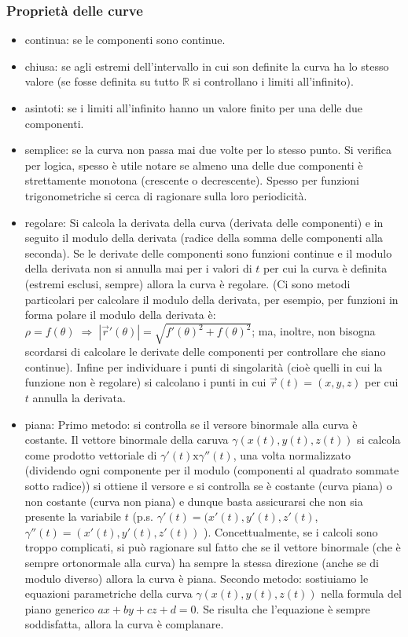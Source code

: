 \subsubsection{Proprietà delle curve}
\begin{itemize}
    \item continua: se le componenti sono continue.
    \item chiusa: se agli estremi dell'intervallo in cui son definite la curva ha lo stesso valore (se fosse definita su tutto $\mathbb{R}$ si controllano i limiti all'infinito).
    \item asintoti: se i limiti all'infinito hanno un valore finito per una delle due componenti.
    \item semplice: se la curva non passa mai due volte per lo stesso punto. Si verifica per logica, spesso è utile notare se almeno una delle due componenti è strettamente monotona (crescente o decrescente). Spesso per funzioni trigonometriche si cerca di ragionare sulla loro periodicità.
    \item regolare: Si calcola la derivata della curva (derivata delle componenti) e in seguito il modulo della derivata (radice della somma delle componenti alla seconda). Se le derivate delle componenti sono funzioni continue e il modulo della derivata non si annulla mai per i valori di $t$ per cui la curva è definita (estremi esclusi, sempre) allora la curva è regolare. (Ci sono metodi particolari per calcolare il modulo della derivata, per esempio, per funzioni in forma polare il modulo della derivata è: $\rho = f(\theta) \; \Rightarrow \; |\vec{r}'(\theta)| = \sqrt{f'(\theta)^2 + f(\theta)^2}$; ma, inoltre, non bisogna scordarsi di calcolare le derivate delle componenti per controllare che siano continue).\newline
    Infine per individuare i punti di singolarità (cioè quelli in cui la funzione non è regolare) si calcolano i punti in cui $\vec{r}(t) = (x,y,z)$ per cui $t$ annulla la derivata.
    \item piana: \newline
    Primo metodo: si controlla se il versore binormale alla curva è costante. Il vettore binormale della caruva $\gamma(x(t), y(t), z(t))$ si calcola come prodotto vettoriale di $\gamma'(t) \text{x} \gamma''(t)$, una volta normalizzato (dividendo ogni componente per il modulo (componenti al quadrato sommate sotto radice)) si ottiene il versore e si controlla se è costante (curva piana) o non costante (curva non piana) e dunque basta assicurarsi che non sia presente la variabile $t$ (p.s. $\gamma'(t) = (x'(t), y'(t), z'(t)$, $\gamma''(t) = (x'(t), y'(t), z'(t))$ ). Concettualmente, se i calcoli sono troppo complicati, si può ragionare sul fatto che se il vettore binormale (che è sempre ortonormale alla curva) ha sempre la stessa direzione (anche se di modulo diverso) allora la curva è piana.\newline
    Secondo metodo: sostiuiamo le equazioni parametriche della curva $\gamma(x(t), y(t), z(t))$ nella formula del piano generico $ax + by +cz + d = 0$. Se risulta che l'equazione è sempre soddisfatta, allora la curva è complanare.
\end{itemize}
